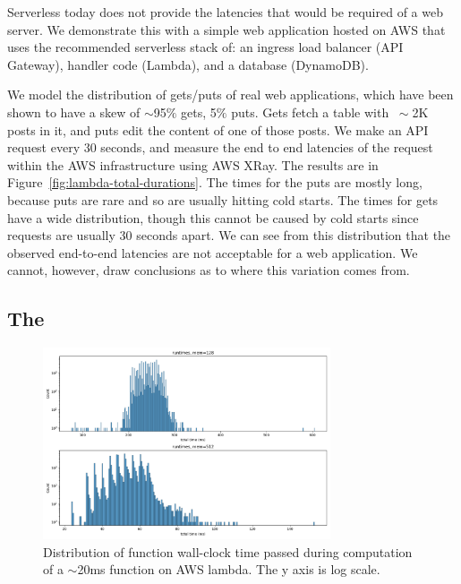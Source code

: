 Serverless today does not provide the latencies that would be required of a web
server. We demonstrate this with a simple web application hosted on AWS that
uses the recommended serverless stack of: an ingress load balancer (API
Gateway), handler code (Lambda), and a database (DynamoDB). 

We model the distribution of gets/puts of real web applications, which have been
shown to have a skew of $\sim$95$\%$ gets, 5$\%$ puts. Gets fetch a table with
$~\sim$2K posts in it, and puts edit the content of one of those posts. We make
an API request every 30 seconds, and measure the end to end latencies of the
request within the AWS infrastructure using AWS XRay. The results are in
Figure~\ref{fig:lambda-total-durations}. The times for the puts are mostly long,
because puts are rare and so are usually hitting cold starts. The times for gets
have a wide distribution, though this cannot be caused by cold starts since
requests are usually 30 seconds apart. We can see from this distribution that
the observed end-to-end latencies are not acceptable for a web application. We
cannot, however, draw conclusions as to where this variation comes from.




\subsection{The \problem{}}

\begin{figure}[t!]
  \centering
    \includegraphics[width=8.5cm]{img/aws_cpubench_times.png}
    \caption{ Distribution of function wall-clock time passed during computation of a $\sim$20ms function on AWS lambda. The y axis is log scale. }
  \label{fig:lambda-cpu-bench}
\end{figure}

